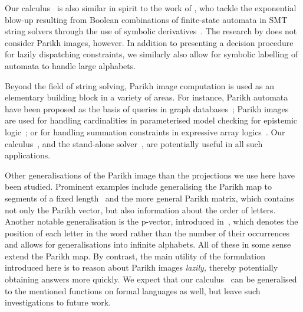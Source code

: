 Our calculus~\Calculus{} is also similar in spirit to the work
of \citeauthor{symbolic-boolean-derivatives}, who tackle the exponential
blow-up resulting from Boolean combinations
of finite-state automata in SMT string solvers
through the use of symbolic derivatives~\cite{symbolic-boolean-derivatives}.
 The research by
 \citeauthor{symbolic-boolean-derivatives} does not consider Parikh images,
 however. In addition to presenting a decision procedure for lazily dispatching
constraints, we similarly also allow for symbolic labelling of automata to
handle large alphabets.

Beyond the field of string solving, Parikh image computation is used
as an elementary building block in a variety of areas.  For instance,
Parikh automata have been proposed as the basis of queries in graph
databases~\cite{graph-queries}; Parikh images are used for handling
cardinalities in parameterised model checking for epistemic
logic~\cite{epistemic-logic}; or for handling summation constraints in
expressive array logics~\cite{rodrigoRaya}. Our calculus~\Calculus{},
and the stand-alone solver~\Catra{},
are potentially useful in all such applications.

Other generalisations of the Parikh image than the projections we use here
have been studied. Prominent examples include generalising the Parikh map to
segments of a fixed length~\cite{KARHUMAKI1980155} and the more general Parikh
matrix, which contains not only the Parikh vector, but also information about
the order of letters. Another notable generalisation is the p-vector, introduced
in~\cite{infinite-words}, which denotes the position of each letter in the word
rather than the number of their occurrences and allows for generalisations into
infinite alphabets. All of these in some sense extend the Parikh map. By
contrast, the main utility of the formulation introduced here is to reason
about Parikh images \emph{lazily,}
thereby potentially obtaining answers more quickly. We expect that our
calculus~\Calculus{} can be generalised to the mentioned functions on
formal languages as well, but leave such investigations to future work.


